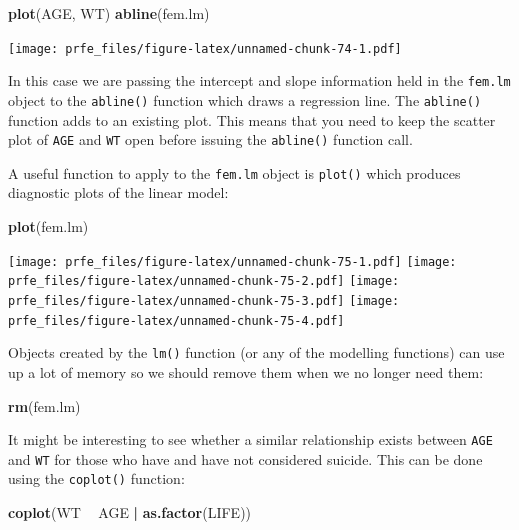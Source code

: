 \documentclass[]{book}
\newenvironment{Shaded}{\begin{snugshade}}{\end{snugshade}}
\newcommand{\KeywordTok}[1]{\textcolor[rgb]{0.13,0.29,0.53}{\textbf{#1}}}
\newcommand{\StringTok}[1]{\textcolor[rgb]{0.31,0.60,0.02}{#1}}
\newcommand{\OperatorTok}[1]{\textcolor[rgb]{0.81,0.36,0.00}{\textbf{#1}}}
\newcommand{\NormalTok}[1]{#1}
\theoremstyle{definition}
\theoremstyle{definition}
\theoremstyle{definition}
\theoremstyle{remark}
\begin{document}
\begin{Shaded}
\begin{Highlighting}[]
\KeywordTok{plot}\NormalTok{(AGE, WT)}
\KeywordTok{abline}\NormalTok{(fem.lm)}
\end{Highlighting}
\end{Shaded}

\texttt{[image: prfe\_files/figure-latex/unnamed-chunk-74-1.pdf]}

In this case we are passing the intercept and slope information held in
the \texttt{fem.lm} object to the \texttt{abline()} function which draws
a regression line. The \texttt{abline()} function adds to an existing
plot. This means that you need to keep the scatter plot of \texttt{AGE}
and \texttt{WT} open before issuing the \texttt{abline()} function call.

A useful function to apply to the \texttt{fem.lm} object is
\texttt{plot()} which produces diagnostic plots of the linear model:

\begin{Shaded}
\begin{Highlighting}[]
\KeywordTok{plot}\NormalTok{(fem.lm)}
\end{Highlighting}
\end{Shaded}

\texttt{[image: prfe\_files/figure-latex/unnamed-chunk-75-1.pdf]}
\texttt{[image: prfe\_files/figure-latex/unnamed-chunk-75-2.pdf]}
\texttt{[image: prfe\_files/figure-latex/unnamed-chunk-75-3.pdf]}
\texttt{[image: prfe\_files/figure-latex/unnamed-chunk-75-4.pdf]}

Objects created by the \texttt{lm()} function (or any of the modelling
functions) can use up a lot of memory so we should remove them when we
no longer need them:

\begin{Shaded}
\begin{Highlighting}[]
\KeywordTok{rm}\NormalTok{(fem.lm)}
\end{Highlighting}
\end{Shaded}

It might be interesting to see whether a similar relationship exists
between \texttt{AGE} and \texttt{WT} for those who have and have not
considered suicide. This can be done using the \texttt{coplot()}
function:

\begin{Shaded}
\begin{Highlighting}[]
\KeywordTok{coplot}\NormalTok{(WT }\OperatorTok{~}\StringTok{ }\NormalTok{AGE }\OperatorTok{|}\StringTok{ }\KeywordTok{as.factor}\NormalTok{(LIFE))}
\end{Highlighting}
\end{Shaded}
\end{document}
